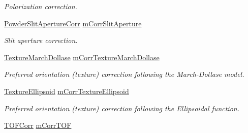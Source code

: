 \begin{DoxyCompactItemize}
\begin{DoxyCompactList}\small\item\em Polarization correction. \end{DoxyCompactList}\item 
\mbox{\label{class_obj_cryst_1_1_powder_pattern_diffraction_ab2147524769083aaf24c8518ae4c6aab}} 
\mbox{\hyperlink{class_obj_cryst_1_1_powder_slit_aperture_corr}{Powder\+Slit\+Aperture\+Corr}} \mbox{\hyperlink{class_obj_cryst_1_1_powder_pattern_diffraction_ab2147524769083aaf24c8518ae4c6aab}{m\+Corr\+Slit\+Aperture}}
\begin{DoxyCompactList}\small\item\em Slit aperture correction. \end{DoxyCompactList}\item 
\mbox{\label{class_obj_cryst_1_1_powder_pattern_diffraction_aa2b7ce1dd0f5b396d9cbf86dcbe96b30}} 
\mbox{\hyperlink{class_obj_cryst_1_1_texture_march_dollase}{Texture\+March\+Dollase}} \mbox{\hyperlink{class_obj_cryst_1_1_powder_pattern_diffraction_aa2b7ce1dd0f5b396d9cbf86dcbe96b30}{m\+Corr\+Texture\+March\+Dollase}}
\begin{DoxyCompactList}\small\item\em Preferred orientation (texture) correction following the March-\/\+Dollase model. \end{DoxyCompactList}\item 
\mbox{\label{class_obj_cryst_1_1_powder_pattern_diffraction_af7a16cc1c552a9c7cedb2d9a05b85e4d}} 
\mbox{\hyperlink{class_obj_cryst_1_1_texture_ellipsoid}{Texture\+Ellipsoid}} \mbox{\hyperlink{class_obj_cryst_1_1_powder_pattern_diffraction_af7a16cc1c552a9c7cedb2d9a05b85e4d}{m\+Corr\+Texture\+Ellipsoid}}
\begin{DoxyCompactList}\small\item\em Preferred orientation (texture) correction following the Ellipsoidal function. \end{DoxyCompactList}\item 
\mbox{\label{class_obj_cryst_1_1_powder_pattern_diffraction_a6a4defa4d63105fb531871c7460ac9b9}} 
\mbox{\hyperlink{class_obj_cryst_1_1_t_o_f_corr}{T\+O\+F\+Corr}} \mbox{\hyperlink{class_obj_cryst_1_1_powder_pattern_diffraction_a6a4defa4d63105fb531871c7460ac9b9}{m\+Corr\+T\+OF}}

\end{DoxyCompactItemize}
